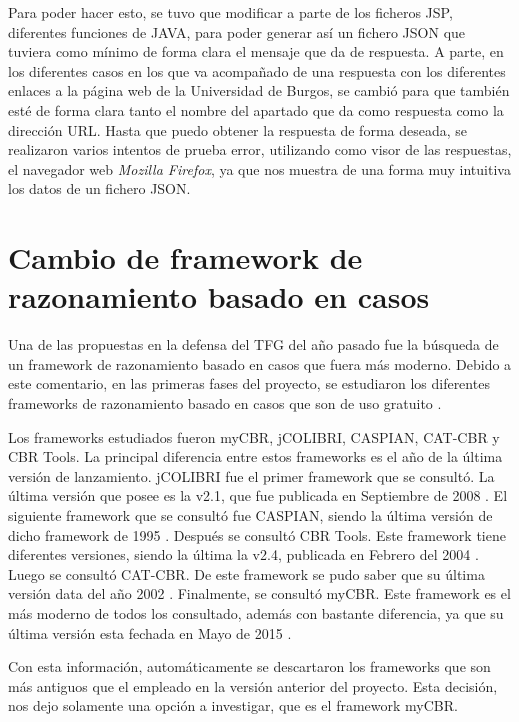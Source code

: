 Para poder hacer esto, se tuvo que modificar a parte de los ficheros JSP, diferentes funciones de JAVA, para poder generar así un fichero JSON que tuviera como mínimo de forma clara el mensaje que da de respuesta. A parte, en los diferentes casos en los que va acompañado de una respuesta con los diferentes enlaces a la página web de la Universidad de Burgos, se cambió para que también esté de forma clara tanto el nombre del apartado que da como respuesta como la dirección URL. Hasta que puedo obtener la respuesta de forma deseada, se realizaron varios intentos de prueba error, utilizando como visor de las respuestas, el navegador web \textit{Mozilla Firefox}, ya que nos muestra de una forma muy intuitiva los datos de un fichero JSON.

\section{Cambio de framework de razonamiento basado en casos} \label{cambioCBR}

Una de las propuestas en la defensa del TFG del año pasado fue la búsqueda de un framework de razonamiento basado en casos que fuera más moderno. Debido a este comentario, en las primeras fases del proyecto, se estudiaron los diferentes frameworks de razonamiento basado en casos que son de uso gratuito \cite{cbrcomp:art}.

Los frameworks estudiados fueron myCBR, jCOLIBRI, CASPIAN, CAT-CBR y CBR Tools. La principal diferencia entre estos frameworks es el año de la última versión de lanzamiento. jCOLIBRI fue el primer framework que se consultó. La última versión que posee es la v2.1, que fue publicada en Septiembre de 2008 \cite{jcolibri:info}. El siguiente framework que se consultó fue CASPIAN, siendo la última versión de dicho framework de 1995 \cite{caspian:info}. Después se consultó CBR Tools. Este framework tiene diferentes versiones, siendo la última la v2.4, publicada en Febrero del 2004 \cite{cbrtools:info}. Luego se consultó CAT-CBR. De este framework se pudo saber que su última versión data del año 2002 \cite{catcbr:info}. Finalmente, se consultó myCBR. Este framework es el más moderno de todos los consultado, además con bastante diferencia, ya que su última versión esta fechada en Mayo de 2015 \cite{mycbr:info}.

Con esta información, automáticamente se descartaron los frameworks que son más antiguos que el empleado en la versión anterior del proyecto. Esta decisión, nos dejo solamente una opción a investigar, que es el framework myCBR.

